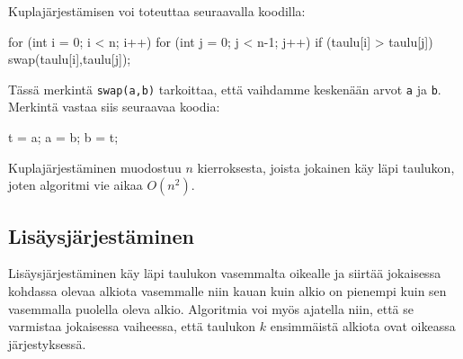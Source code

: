 Kuplajärjestämisen voi toteuttaa seuraavalla koodilla:

\begin{code}
for (int i = 0; i < n; i++) {
    for (int j = 0; j < n-1; j++) {
        if (taulu[i] > taulu[j]) {
            swap(taulu[i],taulu[j]);
        }
    }
}
\end{code}

Tässä merkintä \texttt{swap(a,b)} tarkoittaa,
että vaihdamme keskenään arvot \texttt{a} ja \texttt{b}.
Merkintä vastaa siis seuraavaa koodia:

\begin{code}
t = a;
a = b;
b = t;
\end{code}

Kuplajärjestäminen muodostuu $n$ kierroksesta,
joista jokainen käy läpi taulukon,
joten algoritmi vie aikaa $O(n^2)$.

\subsection{Lisäysjärjestäminen}

Lisäysjärjestäminen käy läpi taulukon vasemmalta oikealle
ja siirtää jokaisessa kohdassa olevaa alkiota vasemmalle
niin kauan kuin alkio on pienempi kuin sen vasemmalla
puolella oleva alkio.
Algoritmia voi myös ajatella niin,
että se varmistaa jokaisessa vaiheessa,
että taulukon $k$ ensimmäistä alkiota ovat oikeassa järjestyksessä.

